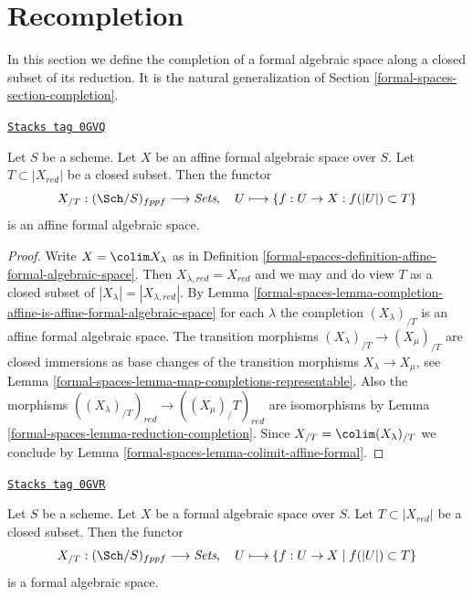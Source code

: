 \section{Recompletion}
\label{formal-spaces-section-recompletion}
In this section we define the completion of a formal algebraic
space along a closed subset of its reduction. It is the natural
generalization of Section \ref{formal-spaces-section-completion}.

\begin{lemma}
\label{formal-spaces-lemma-completion-affine-formal-is-affine-formal}
\href{https://stacks.math.columbia.edu/tag/0GVQ}{\texttt{Stacks tag 0GVQ}}

Let $S$ be a scheme. Let $X$ be an affine formal algebraic space over $S$.
Let $T \subset |X_{red}|$ be a closed subset. Then the functor
$$
X_{/T} : (\Sch/S)_{fppf} \longrightarrow \textit{Sets},\quad
U \longmapsto \{f : U \to X : f(|U|) \subset T\}
$$
is an affine formal algebraic space.
\end{lemma}

\begin{proof}
Write $X = \colim X_\lambda$ as in
Definition \ref{formal-spaces-definition-affine-formal-algebraic-space}.
Then $X_{\lambda, red} = X_{red}$ and we may and do view
$T$ as a closed subset of $|X_\lambda| = |X_{\lambda, red}|$.
By Lemma \ref{formal-spaces-lemma-completion-affine-is-affine-formal-algebraic-space}
for each $\lambda$ the completion
$(X_\lambda)_{/T}$ is an affine formal algebraic space.
The transition morphisms $(X_\lambda)_{/T} \to (X_\mu)_{/T}$ are
closed immersions as base changes of the transition morphisms
$X_\lambda \to X_\mu$, see Lemma \ref{formal-spaces-lemma-map-completions-representable}.
Also the morphisms $((X_\lambda)_{/T})_{red} \to ((X_\mu)_/T)_{red}$
are isomorphisms by Lemma \ref{formal-spaces-lemma-reduction-completion}.
Since $X_{/T} = \colim (X_\lambda)_{/T}$ we conclude
by Lemma \ref{formal-spaces-lemma-colimit-affine-formal}.
\end{proof}

\begin{lemma}
\label{formal-spaces-lemma-completion-fas-is-fas}
\href{https://stacks.math.columbia.edu/tag/0GVR}{\texttt{Stacks tag 0GVR}}

Let $S$ be a scheme. Let $X$ be a formal algebraic space over $S$.
Let $T \subset |X_{red}|$ be a closed subset. Then the functor
$$
X_{/T} : (\Sch/S)_{fppf} \longrightarrow \textit{Sets},\quad
U \longmapsto \{f : U \to X \mid f(|U|) \subset T\}
$$
is a formal algebraic space.
\end{lemma}

